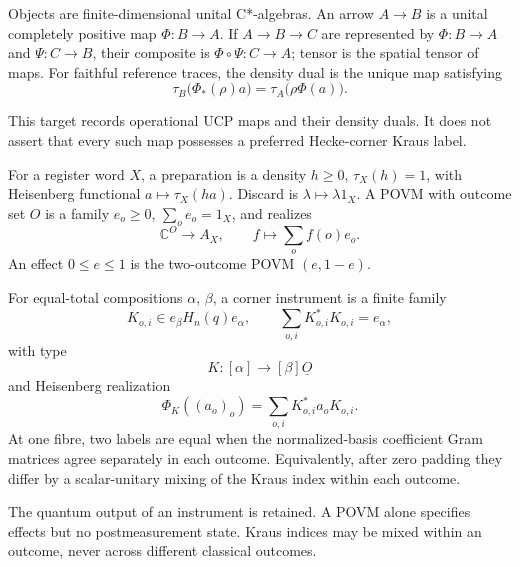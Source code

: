 \begin{definition}
Objects are finite-dimensional unital C*-algebras.  An arrow $A\to B$ is a
unital completely positive map $\Phi:B\to A$.  If $A\to B\to C$ are
represented by $\Phi:B\to A$ and $\Psi:C\to B$, their composite is
$\Phi\circ\Psi:C\to A$; tensor is the spatial tensor of maps.  For faithful
reference traces, the density dual is the unique map satisfying
\[
 \tau_B\bigl(\Phi_*(\rho)a\bigr)
   =\tau_A\bigl(\rho\Phi(a)\bigr).
\]
\end{definition}
\begin{scope}
This target records operational UCP maps and their density duals.  It does not
assert that every such map possesses a preferred Hecke-corner Kraus label.
\end{scope}

\begin{definition}
For a register word $X$, a preparation is a density
$h\geq0$, $\tau_X(h)=1$, with Heisenberg functional
$a\mapsto\tau_X(ha)$.  Discard is $\lambda\mapsto\lambda1_X$.  A POVM with
outcome set $O$ is a family $e_o\geq0$, $\sum_oe_o=1_X$, and realizes
\[
 \mathbb C^O\longrightarrow A_X,\qquad
 f\longmapsto\sum_of(o)e_o.
\]
An effect $0\leq e\leq1$ is the two-outcome POVM $(e,1-e)$.

For equal-total compositions $\alpha,\,\beta$, a corner instrument is a
finite family
\[
 K_{o,i}\in e_\beta H_n(q)e_\alpha,\qquad
 \sum_{o,i}K_{o,i}^*K_{o,i}=e_\alpha,
\]
with type
\[
 K:[\alpha]\longrightarrow[\beta]\underline O
\]
and Heisenberg realization
\[
 \Phi_K((a_o)_o)=\sum_{o,i}K_{o,i}^*a_oK_{o,i}.
\]
At one fibre, two labels are equal when the normalized-basis coefficient
Gram matrices agree separately in each outcome.  Equivalently, after zero
padding they differ by a scalar-unitary mixing of the Kraus index within each
outcome.
\end{definition}
\begin{scope}
The quantum output of an instrument is retained.  A POVM alone specifies
effects but no postmeasurement state.  Kraus indices may be mixed within an
outcome, never across different classical outcomes.
\end{scope}

